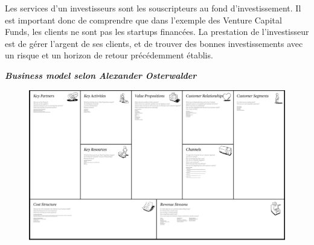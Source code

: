 \documentclass[12pt,oneside,a4paper]{article}
\begin{document}
Les services d'un investisseurs sont les souscripteurs au fond d'investissement. Il est important donc de comprendre que dans l'exemple des Venture Capital Funds, les clients ne sont pas les startups financées.
La prestation de l'investisseur est de gérer l'argent de ses clients, et de trouver des bonnes investissements avec un risque et un horizon de retour précédemment établis.

\textbf{\emph{Business model selon Alexander Osterwalder}}
\begin{figure}[h]
	\begin{center}
		\includegraphics[scale=0.5]{./img/im1}
	\end{center}
\end{figure}
\end{document}
